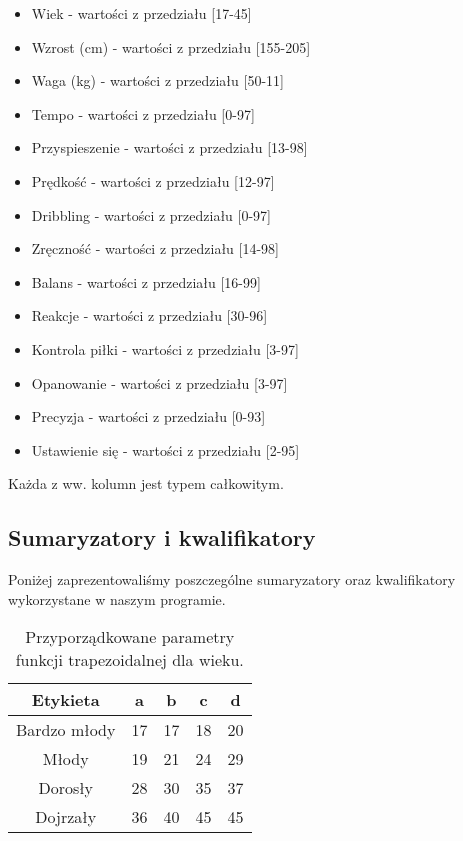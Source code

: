 \documentclass{classrep}
\begin{document}
\begin{itemize}
	\item Wiek - wartości z przedziału [17-45]
	\item Wzrost (cm) - wartości z przedziału [155-205]
	\item Waga (kg) - wartości z przedziału [50-11] 
	\item Tempo - wartości z przedziału [0-97]
	\item Przyspieszenie - wartości z przedziału [13-98]
	\item Prędkość - wartości z przedziału [12-97]
	\item Dribbling - wartości z przedziału [0-97]
	\item Zręczność - wartości z przedziału [14-98]
	\item Balans - wartości z przedziału [16-99]
	\item Reakcje - wartości z przedziału [30-96]
	\item Kontrola piłki - wartości z przedziału [3-97]
	\item Opanowanie - wartości z przedziału [3-97]
	\item Precyzja - wartości z przedziału [0-93]
	\item Ustawienie się - wartości z przedziału [2-95]
\end{itemize}

Każda z ww. kolumn jest typem całkowitym.

\subsection{Sumaryzatory i kwalifikatory}
Poniżej zaprezentowaliśmy poszczególne sumaryzatory oraz kwalifikatory wykorzystane w naszym programie. 

\begin{table}[H]
	\centering
	\begin{tabular}{c c c c c} 
		\hline
		\textbf{Etykieta} & \textbf{a} & \textbf{b} & \textbf{c} &  \textbf{d} \\ [0.5ex] 
		\hline
		\hline 
		Bardzo młody & 17 & 17 & 18 & 20 \\ 
		Młody & 19 & 21 & 24 & 29 \\
		Dorosły & 28 & 30 & 35 & 37 \\
		Dojrzały & 36 & 40 & 45 & 45\\
		\hline
	\end{tabular}
	\caption{Przyporządkowane parametry funkcji trapezoidalnej dla wieku.}
\end{table}
\end{document}
